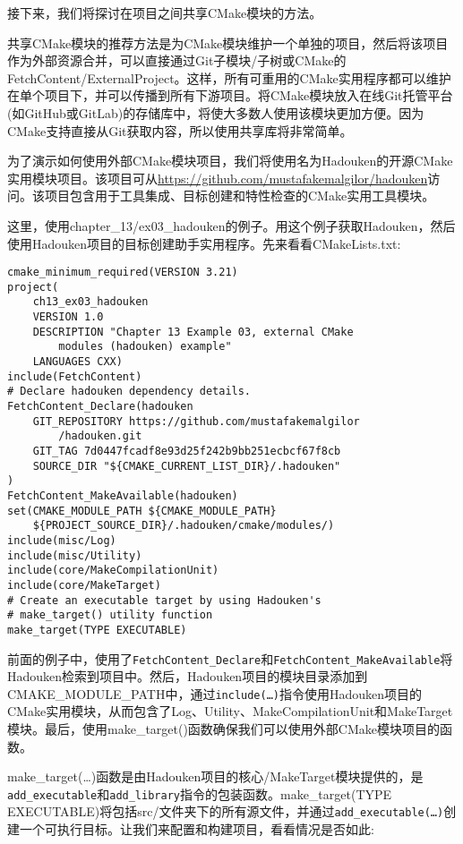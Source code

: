 接下来，我们将探讨在项目之间共享CMake模块的方法。


共享CMake模块的推荐方法是为CMake模块维护一个单独的项目，然后将该项目作为外部资源合并，可以直接通过Git子模块/子树或CMake的FetchContent/ExternalProject。这样，所有可重用的CMake实用程序都可以维护在单个项目下，并可以传播到所有下游项目。将CMake模块放入在线Git托管平台(如GitHub或GitLab)的存储库中，将使大多数人使用该模块更加方便。因为CMake支持直接从Git获取内容，所以使用共享库将非常简单。

为了演示如何使用外部CMake模块项目，我们将使用名为Hadouken的开源CMake实用模块项目。该项目可从\url{https://github.com/mustafakemalgilor/hadouken}访问。该项目包含用于工具集成、目标创建和特性检查的CMake实用工具模块。

这里，使用chapter\_13/ex03\_hadouken的例子。用这个例子获取Hadouken，然后使用Hadouken项目的目标创建助手实用程序。先来看看CMakeLists.txt:

\begin{lstlisting}[style=styleCMake]
cmake_minimum_required(VERSION 3.21)
project(
	ch13_ex03_hadouken
	VERSION 1.0
	DESCRIPTION "Chapter 13 Example 03, external CMake
		modules (hadouken) example"
	LANGUAGES CXX)
include(FetchContent)
# Declare hadouken dependency details.
FetchContent_Declare(hadouken
	GIT_REPOSITORY https://github.com/mustafakemalgilor
		/hadouken.git
	GIT_TAG 7d0447fcadf8e93d25f242b9bb251ecbcf67f8cb
	SOURCE_DIR "${CMAKE_CURRENT_LIST_DIR}/.hadouken"
)
FetchContent_MakeAvailable(hadouken)
set(CMAKE_MODULE_PATH ${CMAKE_MODULE_PATH}
	${PROJECT_SOURCE_DIR}/.hadouken/cmake/modules/)
include(misc/Log)
include(misc/Utility)
include(core/MakeCompilationUnit)
include(core/MakeTarget)
# Create an executable target by using Hadouken's
# make_target() utility function
make_target(TYPE EXECUTABLE)
\end{lstlisting}

前面的例子中，使用了\texttt{FetchContent\_Declare}和\texttt{FetchContent\_MakeAvailable}将Hadouken检索到项目中。然后，Hadouken项目的模块目录添加到CMAKE\_MODULE\_PATH中，通过\texttt{include(…)}指令使用Hadouken项目的CMake实用模块，从而包含了Log、Utility、MakeCompilationUnit和MakeTarget模块。最后，使用make\_target()函数确保我们可以使用外部CMake模块项目的函数。

make\_target(…)函数是由Hadouken项目的核心/MakeTarget模块提供的，是\texttt{add\_executable}和\texttt{add\_library}指令的包装函数。make\_target(TYPE EXECUTABLE)将包括src/文件夹下的所有源文件，并通过\texttt{add\_executable(…)}创建一个可执行目标。让我们来配置和构建项目，看看情况是否如此:

